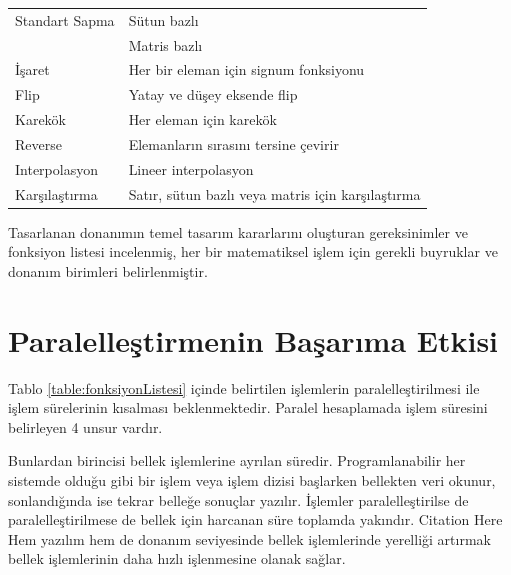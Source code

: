 \begin{longtable}{p{80pt} p{250pt}}
 Standart Sapma					& Sütun bazlı 	 																							\\%
 												& Matris bazlı 	 																							\\%
 İşaret									& Her bir eleman için signum fonksiyonu 											\\%
 Flip										& Yatay ve düşey eksende flip 																\\%
 Karekök 								& Her eleman için karekök 																		\\%
 Reverse 								& Elemanların sırasını tersine çevirir 												\\%
 Interpolasyon 					& Lineer interpolasyon 																				\\%
 Karşılaştırma 					& Satır, sütun bazlı veya matris için karşılaştırma 					\\%
\end{longtable}

Tasarlanan donanımın temel tasarım kararlarını oluşturan gereksinimler ve fonksiyon listesi incelenmiş, her bir matematiksel işlem için gerekli buyruklar ve donanım birimleri belirlenmiştir. 


\section{Paralelleştirmenin Başarıma Etkisi}
Tablo \ref{table:fonksiyonListesi} içinde belirtilen işlemlerin paralelleştirilmesi ile işlem sürelerinin kısalması beklenmektedir. Paralel hesaplamada işlem süresini belirleyen 4 unsur vardır. \par

Bunlardan birincisi bellek işlemlerine ayrılan süredir. Programlanabilir her sistemde olduğu gibi bir işlem veya işlem dizisi başlarken bellekten veri okunur, sonlandığında ise tekrar belleğe sonuçlar yazılır. İşlemler paralelleştirilse de paralelleştirilmese de bellek için harcanan süre toplamda yakındır. {Citation Here} Hem yazılım hem de donanım seviyesinde bellek işlemlerinde yerelliği artırmak bellek işlemlerinin daha hızlı işlenmesine olanak sağlar.\par


